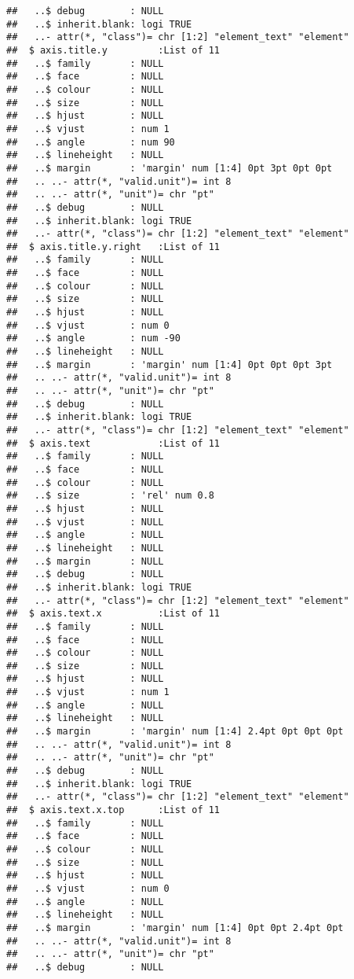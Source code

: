 \documentclass[]{article}
\begin{document}
\begin{verbatim}
##   ..$ debug        : NULL
##   ..$ inherit.blank: logi TRUE
##   ..- attr(*, "class")= chr [1:2] "element_text" "element"
##  $ axis.title.y         :List of 11
##   ..$ family       : NULL
##   ..$ face         : NULL
##   ..$ colour       : NULL
##   ..$ size         : NULL
##   ..$ hjust        : NULL
##   ..$ vjust        : num 1
##   ..$ angle        : num 90
##   ..$ lineheight   : NULL
##   ..$ margin       : 'margin' num [1:4] 0pt 3pt 0pt 0pt
##   .. ..- attr(*, "valid.unit")= int 8
##   .. ..- attr(*, "unit")= chr "pt"
##   ..$ debug        : NULL
##   ..$ inherit.blank: logi TRUE
##   ..- attr(*, "class")= chr [1:2] "element_text" "element"
##  $ axis.title.y.right   :List of 11
##   ..$ family       : NULL
##   ..$ face         : NULL
##   ..$ colour       : NULL
##   ..$ size         : NULL
##   ..$ hjust        : NULL
##   ..$ vjust        : num 0
##   ..$ angle        : num -90
##   ..$ lineheight   : NULL
##   ..$ margin       : 'margin' num [1:4] 0pt 0pt 0pt 3pt
##   .. ..- attr(*, "valid.unit")= int 8
##   .. ..- attr(*, "unit")= chr "pt"
##   ..$ debug        : NULL
##   ..$ inherit.blank: logi TRUE
##   ..- attr(*, "class")= chr [1:2] "element_text" "element"
##  $ axis.text            :List of 11
##   ..$ family       : NULL
##   ..$ face         : NULL
##   ..$ colour       : NULL
##   ..$ size         : 'rel' num 0.8
##   ..$ hjust        : NULL
##   ..$ vjust        : NULL
##   ..$ angle        : NULL
##   ..$ lineheight   : NULL
##   ..$ margin       : NULL
##   ..$ debug        : NULL
##   ..$ inherit.blank: logi TRUE
##   ..- attr(*, "class")= chr [1:2] "element_text" "element"
##  $ axis.text.x          :List of 11
##   ..$ family       : NULL
##   ..$ face         : NULL
##   ..$ colour       : NULL
##   ..$ size         : NULL
##   ..$ hjust        : NULL
##   ..$ vjust        : num 1
##   ..$ angle        : NULL
##   ..$ lineheight   : NULL
##   ..$ margin       : 'margin' num [1:4] 2.4pt 0pt 0pt 0pt
##   .. ..- attr(*, "valid.unit")= int 8
##   .. ..- attr(*, "unit")= chr "pt"
##   ..$ debug        : NULL
##   ..$ inherit.blank: logi TRUE
##   ..- attr(*, "class")= chr [1:2] "element_text" "element"
##  $ axis.text.x.top      :List of 11
##   ..$ family       : NULL
##   ..$ face         : NULL
##   ..$ colour       : NULL
##   ..$ size         : NULL
##   ..$ hjust        : NULL
##   ..$ vjust        : num 0
##   ..$ angle        : NULL
##   ..$ lineheight   : NULL
##   ..$ margin       : 'margin' num [1:4] 0pt 0pt 2.4pt 0pt
##   .. ..- attr(*, "valid.unit")= int 8
##   .. ..- attr(*, "unit")= chr "pt"
##   ..$ debug        : NULL

\end{verbatim}
\end{document}

